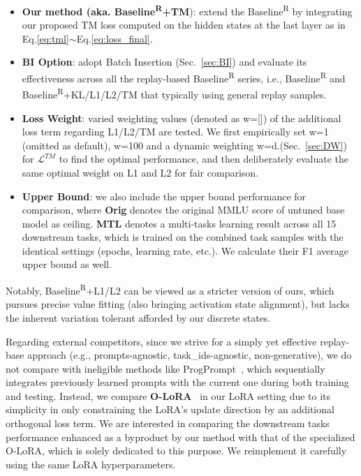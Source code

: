 \begin{itemize}[leftmargin=*, align=left]

    \item \textbf{Our method (aka. Baseline\textsuperscript{R}+TM}): extend the Baseline\textsuperscript{R} by integrating our proposed TM loss computed on the hidden states at the last layer as in Eq.\ref{eq:tml}$\sim$Eq.\ref{eq:loss_final}.
    
    \item \textbf{BI Option}: adopt Batch Insertion (Sec.~\ref{sec:BI}) and evaluate its effectiveness across all the replay-based Baseline\textsuperscript{R} series, i.e., Baseline\textsuperscript{R} and Baseline\textsuperscript{R}+KL/L1/L2/TM that typically using general replay samples.

    \item \textbf{Loss Weight}: varied weighting values (denoted as w=[]) of the additional loss term regarding L1/L2/TM are tested. We first empirically set w=1 (omitted as default), w=100 and a dynamic weighting w=d.(Sec.~\ref{sec:DW}) for $\mathcal{L}^{TM}$ to find the optimal performance, and then deliberately evaluate the same optimal weight on L1 and L2 for fair comparison.

    \item \textbf{Upper Bound}: we also include the upper bound performance for comparison, where \textbf{Orig} denotes the original MMLU score of untuned base model as ceiling. \textbf{MTL} denotes a multi-tasks learning result across all 15 downstream tasks, which is trained on the combined task samples with the identical settings (epochs, learning rate, etc.). We calculate their F1 average upper bound as well.
\end{itemize}

\noindent Notably, Baseline\textsuperscript{R}+L1/L2 can be viewed as a stricter version of ours, which pursues precise value fitting (also bringing activation state alignment), but lacks the inherent variation tolerant afforded by our discrete states.

Regarding external competitors, since we strive for a simply yet effective replay-base approach (e.g., prompts-agnostic, task\_ids-agnostic, non-generative), we do not compare with ineligible methods like ProgPrompt~\cite{razdaibiedina2023progressive}, which sequentially integrates previously learned prompts with the current one during both training and testing.
Instead, we compare \textbf{O-LoRA}~\cite{wang2023orthogonal} in our LoRA setting due to its simplicity in only constraining the LoRA's update direction by an additional orthogonal loss term.
We are interested in comparing the downstream tasks performance enhanced as a byproduct by our method with that of the specialized O-LoRA, which is solely dedicated to this purpose.
We reimplement it carefully using the same LoRA hyperparameters.

